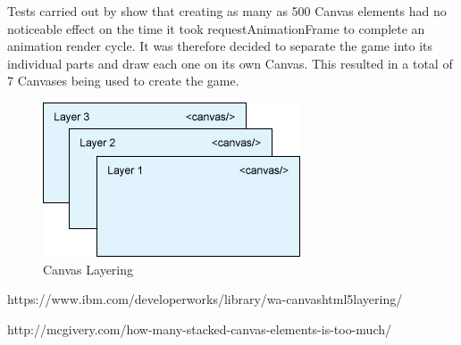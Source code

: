\documentclass[12pt,a4paper]{report}
\begin{document}
Tests carried out by show that creating as many as 500 Canvas elements had no noticeable effect on the time it took requestAnimationFrame to complete an animation render cycle. It was therefore decided to separate the game into its individual parts and draw each one on its own Canvas. This resulted in a total of 7 Canvases being used to create the game.

\begin{figure}[h]
\centering
    \includegraphics[scale=0.5]{canvasLayers}
    \caption{Canvas Layering}
    \label{fig:canvasLayering}
\end{figure}
\FloatBarrier

https://www.ibm.com/developerworks/library/wa-canvashtml5layering/

http://mcgivery.com/how-many-stacked-canvas-elements-is-too-much/


 
\end{document}
